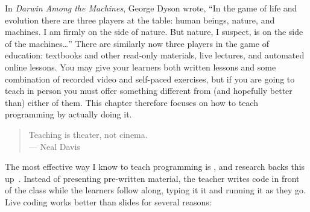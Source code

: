 
In \emph{Darwin Among the Machines},
George Dyson wrote,
``In the game of life and evolution there are three players at the table:
human beings, nature, and machines.
I am firmly on the side of nature.
But nature, I suspect, is on the  side of the machines{\ldots}''
There are similarly now three players in the game of education:
textbooks and other read-only materials,
live lectures,
and automated online lessons.
You may give your learners both written lessons
and some combination of recorded video and self-paced exercises,
but if you are going to teach in person
you must offer something different from (and hopefully better than) either of them.
This chapter therefore focuses on how to teach programming by actually doing it.


\begin{quote}

  Teaching is theater, not cinema. \\
  --- Neal Davis

\end{quote}

The most effective way I know to teach programming is ,
and research backs this up~\cite{Rubi2013,Haar2017}.
Instead of presenting pre-written material,
the teacher writes code in front of the class
while the learners follow along,
typing it it and running it as they go.
Live coding works better than slides for several reasons:

